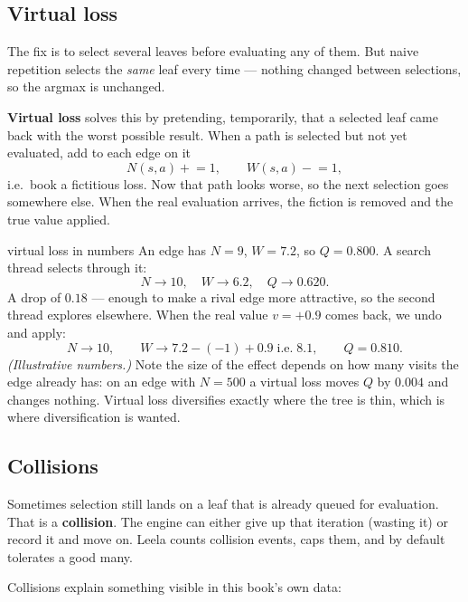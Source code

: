 \subsection{Virtual loss}

The fix is to select several leaves before evaluating any of them. But naive repetition
selects the \emph{same} leaf every time --- nothing changed between selections, so the argmax
is unchanged.

\textbf{Virtual loss} solves this by pretending, temporarily, that a selected leaf came back
with the worst possible result. When a path is selected but not yet evaluated, add to each
edge on it
\[
  N(s,a) \mathrel{+}= 1, \qquad W(s,a) \mathrel{-}= 1 ,
\]
i.e.\ book a fictitious loss. Now that path looks worse, so the next selection goes somewhere
else. When the real evaluation arrives, the fiction is removed and the true value applied.

\begin{worked}{virtual loss in numbers}
An edge has $N = 9$, $W = 7.2$, so $Q = 0.800$. A search thread selects through it:
\[
  N \to 10,\quad W \to 6.2,\quad Q \to 0.620 .
\]
A drop of $0.18$ --- enough to make a rival edge more attractive, so the second thread
explores elsewhere. When the real value $v = +0.9$ comes back, we undo and apply:
\[
  N \to 10, \qquad W \to 7.2 - (-1) + 0.9 \;\text{i.e.}\; 8.1, \qquad Q = 0.810 .
\]
\emph{(Illustrative numbers.)} Note the size of the effect depends on how many visits the
edge already has: on an edge with $N = 500$ a virtual loss moves $Q$ by $0.004$ and changes
nothing. Virtual loss diversifies exactly where the tree is thin, which is where
diversification is wanted.
\end{worked}

\subsection{Collisions}

Sometimes selection still lands on a leaf that is already queued for evaluation. That is a
\textbf{collision}. The engine can either give up that iteration (wasting it) or record it
and move on. Leela counts collision events, caps them, and by default tolerates a good many.

Collisions explain something visible in this book's own data:

